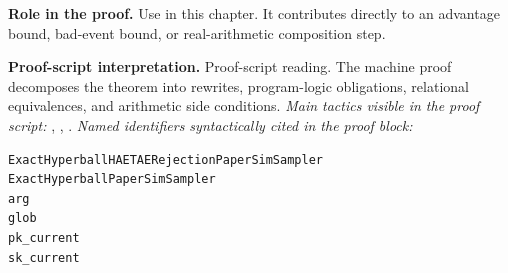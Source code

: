 \begin{formaltheorem}
\noindent\textbf{Role in the proof.}
Use in this chapter. It contributes directly to an advantage bound, bad-event bound, or real-arithmetic composition step.

\noindent\textbf{Proof-script interpretation.}
Proof-script reading. The machine proof decomposes the theorem into rewrites, program-logic obligations, relational equivalences, and arithmetic side conditions.
\emph{Main tactics visible in the proof script:} , , .
\emph{Named identifiers syntactically cited in the proof block:}
\begin{lstlisting}[language=EasyCrypt,basicstyle=\ttfamily\scriptsize]
ExactHyperballHAETAERejectionPaperSimSampler
ExactHyperballPaperSimSampler
arg
glob
pk_current
sk_current
\end{lstlisting}

\end{formaltheorem}

